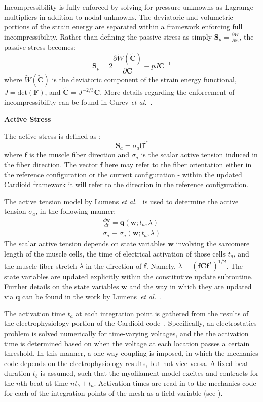 Incompressibility is fully enforced by solving for pressure unknowns as Lagrange multipliers in addition to nodal unknowns. The deviatoric and volumetric portions of the strain energy are separated within a framework enforcing full incompressibility. Rather than defining the passive stress as simply $\bm{S}_p = \frac{\partial W}{\partial \bm{E}}$, the passive stress becomes:
\begin{equation}
\bm{S}_p= 2\frac{\partial{\tilde{W}(\tilde{\bm{C}})}}{\partial{\bm{C}}} - pJ\bm{C}^{-1}
\end{equation}
where $\tilde{W}(\tilde{\bm{C}})$ is the deviatoric component of the strain energy functional, $J = \text{det}(\bm{F})$, and $\tilde{\bm{C}} = J^{-2/3}\bm{C}$. More details regarding the enforcement of incompressibility can be found in Gurev \textit{et al.}~\cite{gurev_2015}.

\textbf{Active Stress}

The active stress is defined as :
\begin{equation}
\bm{S}_a = \sigma_a \bm{f} \bm{f}^{T}
\label{eqn:active}
\end{equation}
where $\bm{f}$ is the muscle fiber direction and ${\sigma_a}$ is the scalar active tension induced in the fiber direction. The vector $\bm{f}$ here may refer to the fiber orientation either in the reference configuration or the current configuration - within the updated Cardioid framework it will refer to the direction in the reference configuration.

The active tension model by Lumens \textit{et al.}~\cite{lumens_2009} is used to determine the active tension $\sigma_a$, in the following manner:
\begin{align}
\frac{d\bm{w}}{dt} = \bm{q}(\bm{w}; t_a, \lambda) \\
\sigma_a \equiv \sigma_a(\bm{w}; t_a, \lambda)
\end{align}
The scalar active tension depends on state variables $\bm{w}$ involving the sarcomere length of the muscle cells, the time of electrical activation of those cells $t_a$, and the muscle fiber stretch $\lambda$ in the direction of $\bm{f}$. Namely, $\lambda = (\bm{f}\bm{C}\bm{f}^T)^{1/2}$. The state variables are updated explicitly within the constitutive update subroutine. Further details on the state variables $\bm{w}$ and the way in which they are updated via $\bm{q}$ can be found in the work by Lumens~\textit{et al.}~\cite{lumens_2009}.

The activation time $t_a$ at each integration point is gathered from the results of the electrophysiology portion of the Cardioid code~\cite{richards_2013}. Specifically, an electrostatics problem is solved numerically for time-varying voltages, and the the activation time is determined based on when the voltage at each location passes a certain threshold. In this manner, a one-way coupling is imposed, in which the mechanics code depends on the electrophysiology results, but not vice versa. A fixed beat duration $t_b$ is assumed, such that the myofilament model excites and contracts for the $n$th beat at time $nt_b + t_a$. Activation times are read in to the mechanics code for each of the integration points of the mesh as a field variable (see ).

